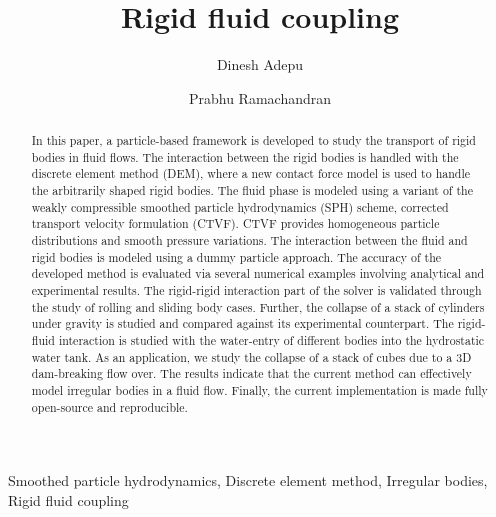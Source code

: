 \documentclass[preprint,12pt]{elsarticle}
\begin{document}
\begin{frontmatter}

  \title{Rigid fluid coupling}
  \author[IITB]{Dinesh Adepu }
   \author[IITB]{Prabhu Ramachandran}
   \address[IITB]{Department of Aerospace
    Engineering, Indian Institute of Technology Bombay, Powai, Mumbai 400076}


\begin{abstract}
  In this paper, a particle-based framework is developed to study the
  transport of rigid bodies in fluid flows. The interaction between the rigid
  bodies is handled with the discrete element method (DEM), where a new
  contact force model is used to handle the arbitrarily shaped rigid bodies.
  The fluid phase is modeled using a variant of the weakly compressible
  smoothed particle hydrodynamics (SPH) scheme, corrected transport velocity
  formulation (CTVF). CTVF provides homogeneous particle distributions and
  smooth pressure variations. The interaction between the fluid and rigid
  bodies is modeled using a dummy particle approach. The accuracy of the
  developed method is evaluated via several numerical examples involving
  analytical and experimental results. The rigid-rigid interaction part of the
  solver is validated through the study of rolling and sliding body cases.
  Further, the collapse of a stack of cylinders under gravity is studied and
  compared against its experimental counterpart. The rigid-fluid interaction
  is studied with the water-entry of different bodies into the hydrostatic
  water tank. As an application, we study the collapse of a stack of cubes due
  to a 3D dam-breaking flow over. The results indicate that the current method
  can effectively model irregular bodies in a fluid flow. Finally, the current
  implementation is made fully open-source and reproducible.
\end{abstract}

\begin{keyword}
{Smoothed particle hydrodynamics}, {Discrete element method}, {Irregular bodies}, {Rigid fluid coupling}


\end{keyword}

\end{frontmatter}
\end{document}
